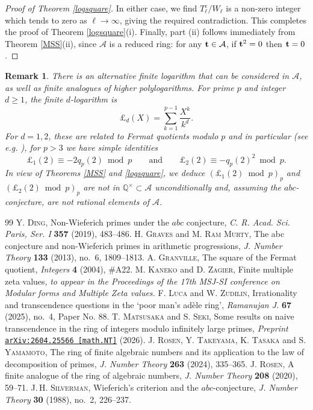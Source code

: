 \documentclass[10pt,a4paper]{amsart}
\newtheorem{remark}[theorem]{\bf Remark}
\newcommand{\cA}{\mathcal A}
\newcommand{\LL}{\pounds}
\begin{document}
\begin{proof}[Proof of Theorem \ref{logsquare}]
In either case, we find $T_\ell^\varepsilon/W_\ell$ is a non-zero integer which tends to zero as $\ell\to\infty$, giving the required contradiction. 
This completes the proof of Theorem \ref{logsquare}(i). 
Finally, part (ii) follows immediately from Theorem \ref{MSS}(ii), since $\cA$ is a reduced ring: for any ${\bf t}\in\cA$, if ${\bf t}^2=0$ then ${\bf t}=0$.
\end{proof}


\begin{remark}
There is an alternative finite logarithm that can be considered in $\cA$, as well as finite analogues of higher polylogarithms. 
For prime $p$ and integer $d\geq 1$, the {\it finite $d$-logarithm} is
\[\LL_{d}(X)=\sum_{k=1}^{p-1}\frac{X^k}{k^d}.\]
For $d=1,2$, these are related to Fermat quotients modulo $p$ and in particular (see e.g. \cite{Gr04}), for $p>3$ we have simple identities
\[\LL_{1}(2)\equiv -2q_p(2)\bmod p\qquad\text{and}\qquad\LL_{2}(2)\equiv -q_p(2)^2\bmod p.\]
In view of Theorems \ref{MSS} and \ref{logsquare}, we deduce $\left(\LL_{1}(2)\bmod p\right)_p$ and $\left(\LL_{2}(2)\bmod p\right)_p$ are not in $\mathbb{Q}^\times\subset\cA$ unconditionally and, assuming the $abc$-conjecture, are not rational elements of $\cA$.
\end{remark}

\begin{thebibliography}{99}
 \textsc{Y. Ding}, Non-{W}ieferich primes under the $abc$ conjecture, \emph{C. R. Acad. Sci. Paris, Ser. I} \textbf{357} (2019), 483--486.
 \textsc{H. Graves} and \textsc{M. Ram Murty}, The abc conjecture and non-{W}ieferich primes in arithmetic progressions, \emph{J. Number Theory} \textbf{133} (2013), no.~6, 1809--1813.
 \textsc{A. Granville}, The square of the Fermat quotient, \emph{Integers} \textbf{4} (2004), \#A22.
 \textsc{M. Kaneko} and \textsc{D. Zagier}, Finite multiple zeta values, \emph{to appear in the Proceedings of the 17th MSJ-SI conference on Modular forms and Multiple Zeta values.}
 \textsc{F. Luca} and \textsc{W. Zudilin}, Irrationality and transcendence questions in the `poor man's ad\`ele ring', \emph{Ramanujan J.} \textbf{67} (2025), no.~4, Paper No. 88.
 \textsc{T. Matsusaka} and \textsc{S. Seki}, Some results on naive transcendence in the ring of integers modulo infinitely large primes, \emph{Preprint} \href{https://arxiv.org/abs/2604.25566}{\texttt{arXiv:2604.25566 [math.NT]}} (2026).
 \textsc{J. Rosen}, \textsc{Y. Takeyama}, \textsc{K. Tasaka} and \textsc{S. Yamamoto}, The ring of finite algebraic numbers and its application to the law of decomposition of primes, \emph{J. Number Theory} \textbf{263} (2024), 335--365.
 \textsc{J. Rosen}, A finite analogue of the ring of algebraic numbers, \emph{J. Number Theory} \textbf{208} (2020), 59--71.
 \textsc{J.\,H. Silverman}, Wieferich's criterion and the $abc$-conjecture, \emph{J. Number Theory} \textbf{30} (1988), no.~2, 226–237.
\end{thebibliography}
\end{document}
